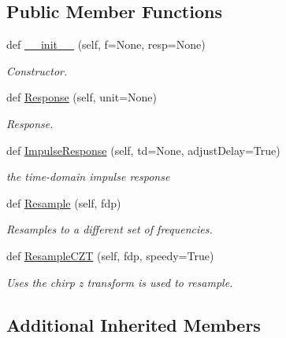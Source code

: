 \subsection*{Public Member Functions}
\begin{DoxyCompactItemize}
\item 
def \hyperlink{classSignalIntegrity_1_1FrequencyDomain_1_1FrequencyResponse_1_1FrequencyResponse_af89c1b84b55a8388acf19c91be67a97e}{\+\_\+\+\_\+init\+\_\+\+\_\+} (self, f=None, resp=None)
\begin{DoxyCompactList}\small\item\em Constructor. \end{DoxyCompactList}\item 
def \hyperlink{classSignalIntegrity_1_1FrequencyDomain_1_1FrequencyResponse_1_1FrequencyResponse_ab4996cceccaa974296395d3039a9ca2a}{Response} (self, unit=None)
\begin{DoxyCompactList}\small\item\em Response. \end{DoxyCompactList}\item 
def \hyperlink{classSignalIntegrity_1_1FrequencyDomain_1_1FrequencyResponse_1_1FrequencyResponse_aa301152e06c3881589eb5c70d53734f6}{Impulse\+Response} (self, td=None, adjust\+Delay=True)
\begin{DoxyCompactList}\small\item\em the time-\/domain impulse response \end{DoxyCompactList}\item 
def \hyperlink{classSignalIntegrity_1_1FrequencyDomain_1_1FrequencyResponse_1_1FrequencyResponse_a6aa7e8bdecb4f17e41d783d00a27fdd8}{Resample} (self, fdp)
\begin{DoxyCompactList}\small\item\em Resamples to a different set of frequencies. \end{DoxyCompactList}\item 
def \hyperlink{classSignalIntegrity_1_1FrequencyDomain_1_1FrequencyResponse_1_1FrequencyResponse_af61ffacaaef319b5b0752778bfe522e6}{Resample\+C\+ZT} (self, fdp, speedy=True)
\begin{DoxyCompactList}\small\item\em Uses the chirp z transform is used to resample. \end{DoxyCompactList}\end{DoxyCompactItemize}
\subsection*{Additional Inherited Members}


